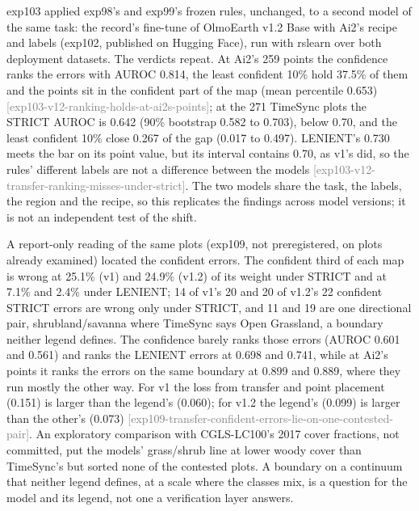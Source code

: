 \documentclass[11pt,a4paper]{article}
\newcommand{\claim}[1]{{\scriptsize\textsf{\textcolor{gray}{[#1]}}}}
\begin{document}
exp103 applied exp98's and exp99's frozen rules, unchanged, to a second model of the same task: the record's fine-tune
of OlmoEarth v1.2 Base with Ai2's recipe and labels (exp102, published on Hugging Face), run with rslearn over both
deployment datasets. The verdicts repeat. At Ai2's 259 points the confidence ranks the errors with AUROC 0.814, the
least confident 10\% hold 37.5\% of them and the points sit in the confident part of the map (mean percentile 0.653)
\claim{exp103-v12-ranking-holds-at-ai2s-points}; at the 271 TimeSync plots the STRICT AUROC is 0.642 (90\% bootstrap
0.582 to 0.703), below 0.70, and the least confident 10\% close 0.267 of the gap (0.017 to 0.497). LENIENT's 0.730
meets the bar on its point value, but its interval contains 0.70, as v1's did, so the rules' different labels are not a
difference between the models \claim{exp103-v12-transfer-ranking-misses-under-strict}. The two models share the task,
the labels, the region and the recipe, so this replicates the findings across model versions; it is not an independent
test of the shift.

A report-only reading of the same plots (exp109, not preregistered, on plots already examined) located the confident
errors. The confident third of each map is wrong at 25.1\% (v1) and 24.9\% (v1.2) of its weight under STRICT and at 7.1\%
and 2.4\% under LENIENT; 14 of v1's 20 and 20 of v1.2's 22 confident STRICT errors are wrong only under STRICT, and 11
and 19 are one directional pair, shrubland/savanna where TimeSync says Open Grassland, a boundary neither legend
defines. The confidence barely ranks those errors (AUROC 0.601 and 0.561) and ranks the LENIENT errors at 0.698 and
0.741, while at Ai2's points it ranks the errors on the same boundary at 0.899 and 0.889, where they run mostly the
other way. For v1 the loss from transfer and point placement (0.151) is larger than the legend's (0.060); for v1.2 the
legend's (0.099) is larger than the other's (0.073) \claim{exp109-transfer-confident-errors-lie-on-one-contested-pair}.
An exploratory comparison with CGLS-LC100's 2017 cover fractions, not committed, put the models' grass/shrub line at
lower woody cover than TimeSync's but sorted none of the contested plots. A boundary on a continuum that neither legend
defines, at a scale where the classes mix, is a question for the model and its legend, not one a verification layer
answers.
\end{document}
